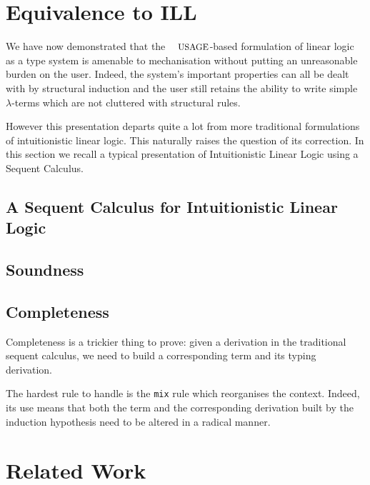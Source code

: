 \documentclass[a4paper,UKenglish]{lipics-v2016}
\begin{document}

\section{Equivalence to ILL}

We have now demonstrated that the $\Usages{}$-based formulation of
linear logic as a type system is amenable to mechanisation without
putting an unreasonable burden on the user. Indeed, the system's
important properties can all be dealt with by structural induction
and the user still retains the ability to write simple $λ$-terms
which are not cluttered with structural rules.

However this presentation departs quite a lot from more traditional
formulations of intuitionistic linear logic. This naturally raises
the question of its correction. In this section we recall a typical
presentation of Intuitionistic Linear Logic using a Sequent Calculus.

\subsection{A Sequent Calculus for Intuitionistic Linear Logic}

\subsection{Soundness}


\subsection{Completeness}

Completeness is a trickier thing to prove: given a derivation in
the traditional sequent calculus, we need to build a corresponding
term and its typing derivation.

The hardest rule to handle is the \texttt{mix} rule which reorganises
the context. Indeed, its use means that both the term and the
corresponding derivation built by the induction hypothesis need to
be altered in a radical manner.





\section{Related Work}
\end{document}
